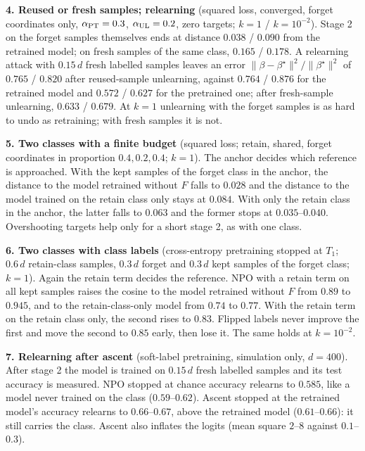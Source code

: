 \documentclass[10pt]{article}
\newcommand{\bs}{\beta^\star}\newcommand{\E}{\mathbb E}\newcommand{\asinh}{\operatorname{arcsinh}}\newcommand{\prox}{\operatorname{prox}}
\begin{document}
\textbf{4. Reused or fresh samples; relearning} (squared loss, converged, forget coordinates only, $\alpha_{\rm PT}=0.3$, $\alpha_{\rm UL}=0.2$, zero targets; $k=1$ / $k=10^{-2}$). Stage 2 on the forget samples themselves ends at distance $0.038$ / $0.090$ from the retrained model; on fresh samples of the same class, $0.165$ / $0.178$. A relearning attack with $0.15\,d$ fresh labelled samples leaves an error $\|\beta-\bs\|^2/\|\bs\|^2$ of $0.765$ / $0.820$ after reused-sample unlearning, against $0.764$ / $0.876$ for the retrained model and $0.572$ / $0.627$ for the pretrained one; after fresh-sample unlearning, $0.633$ / $0.679$. At $k=1$ unlearning with the forget samples is as hard to undo as retraining; with fresh samples it is not.

\textbf{5. Two classes with a finite budget} (squared loss; retain, shared, forget coordinates in proportion $0.4,0.2,0.4$; $k=1$). The anchor decides which reference is approached. With the kept samples of the forget class in the anchor, the distance to the model retrained without $F$ falls to $0.028$ and the distance to the model trained on the retain class only stays at $0.084$. With only the retain class in the anchor, the latter falls to $0.063$ and the former stops at $0.035$--$0.040$. Overshooting targets help only for a short stage 2, as with one class.

\textbf{6. Two classes with class labels} (cross-entropy pretraining stopped at $T_1$; $0.6\,d$ retain-class samples, $0.3\,d$ forget and $0.3\,d$ kept samples of the forget class; $k=1$). Again the retain term decides the reference. NPO with a retain term on all kept samples raises the cosine to the model retrained without $F$ from $0.89$ to $0.945$, and to the retain-class-only model from $0.74$ to $0.77$. With the retain term on the retain class only, the second rises to $0.83$. Flipped labels never improve the first and move the second to $0.85$ early, then lose it. The same holds at $k=10^{-2}$.

\textbf{7. Relearning after ascent} (soft-label pretraining, simulation only, $d=400$). After stage 2 the model is trained on $0.15\,d$ fresh labelled samples and its test accuracy is measured. NPO stopped at chance accuracy relearns to $0.585$, like a model never trained on the class ($0.59$--$0.62$). Ascent stopped at the retrained model's accuracy relearns to $0.66$--$0.67$, above the retrained model ($0.61$--$0.66$): it still carries the class. Ascent also inflates the logits (mean square $2$--$8$ against $0.1$--$0.3$).
\end{document}
